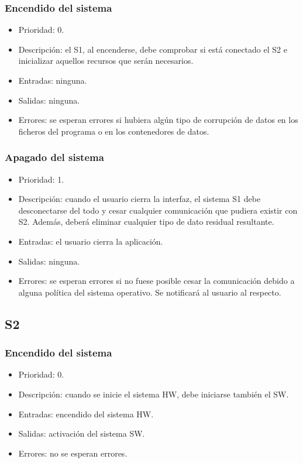 \subsubsection{Encendido del sistema}
\begin{itemize}
    \item Prioridad: 0.
    \item Descripción: el \ac{S1}, al encenderse, debe comprobar si está conectado el \ac{S2} e inicializar aquellos recursos que serán necesarios.
    \item Entradas: ninguna.
    \item Salidas: ninguna.
    \item Errores: se esperan errores si hubiera algún tipo de corrupción de datos en los ficheros del programa o en los contenedores de datos.
\end{itemize}

\subsubsection{Apagado del sistema}
\begin{itemize}
    \item Prioridad: 1.
    \item Descripción: cuando el usuario cierra la interfaz, el sistema \ac{S1} debe desconectarse del todo y cesar cualquier comunicación que pudiera existir con \ac{S2}. Además, deberá eliminar cualquier tipo de dato residual resultante.
    \item Entradas: el usuario cierra la aplicación.
    \item Salidas: ninguna.
    \item Errores: se esperan errores si no fuese posible cesar la comunicación debido a alguna política del sistema operativo. Se notificará al usuario al respecto.
\end{itemize}

\subsection*{\ac{S2}} 
\subsubsection{Encendido del sistema}
\begin{itemize}
    \item Prioridad: 0.
    \item Descripción: cuando se inicie el sistema \ac{HW}, debe iniciarse también el \ac{SW}.
    \item Entradas: encendido del sistema \ac{HW}.
    \item Salidas: activación del sistema \ac{SW}.
    \item Errores: no se esperan errores.
\end{itemize}

